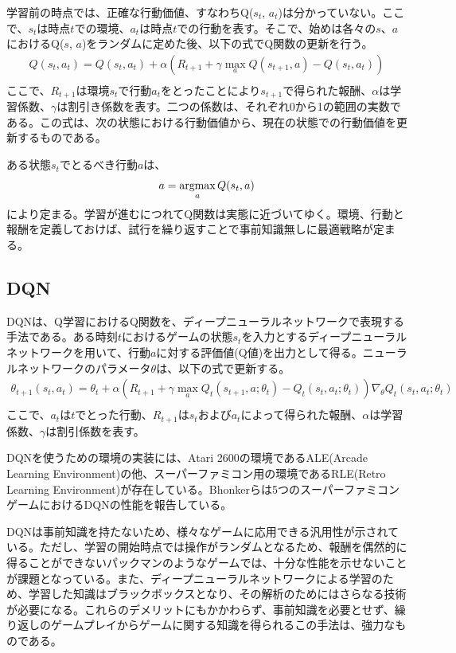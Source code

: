 \documentclass[12pt]{jreport}
\newcommand{\argmax}{\mathop{\rm argmax}\limits}
\begin{document}
学習前の時点では、正確な行動価値、すなわちQ($s_t$, $a_t$)は分かっていない。ここで、$s_t$は時点$t$での環境、$a_t$は時点$t$での行動を表す。そこで、始めは各々の$s$、$a$におけるQ($s$, $a$)をランダムに定めた後、以下の式でQ関数の更新を行う。
\begin{eqnarray}
  Q(s_{t}, a_{t}) = Q(s_t, a_t) + \alpha (R_{t+1} + \gamma \max_a Q(s_{t+1}, a) - Q(s_t, a_t)) \nonumber\\
\end{eqnarray}
ここで、$R_{t+1}$は環境$s_t$で行動$a_t$をとったことにより$s_{t+1}$で得られた報酬、$\alpha$は学習係数、$\gamma$は割引き係数を表す。二つの係数は、それぞれ0から1の範囲の実数である。この式は、次の状態における行動価値から、現在の状態での行動価値を更新するものである。

ある状態$s_t$でとるべき行動$a$は、
\[
a = \argmax_a Q(s_t, a)
\]
により定まる。学習が進むにつれてQ関数は実態に近づいてゆく。環境、行動と報酬を定義しておけば、試行を繰り返すことで事前知識無しに最適戦略が定まる。

\subsection{DQN}
DQNは、Q学習におけるQ関数を、ディープニューラルネットワークで表現する手法である。ある時刻$t$におけるゲームの状態$s_t$を入力とするディープニューラルネットワークを用いて、行動$a$に対する評価値(Q値)を出力として得る。ニューラルネットワークのパラメータ$\theta$は、以下の式で更新する。
\begin{eqnarray}
\theta_{t+1}(s_t, a_t) = \theta_t + \alpha (R_{t+1} + \gamma \max_a Q_t(s_{t+1}, a; \theta_t) - Q_t(s_t, a_t; \theta_t))\nabla_\theta Q_t(s_t, a_t; \theta_t) \nonumber\\
\end{eqnarray}
ここで、$a_t$は$t$でとった行動、$R_{t+1}$は$s_t$および$a_t$によって得られた報酬、$\alpha$は学習係数、$\gamma$は割引係数を表す。

DQNを使うための環境の実装には、Atari 2600の環境であるALE(Arcade Learning Environment)\cite{ALE}の他、スーパーファミコン用の環境であるRLE(Retro Learning Environment)\cite{RLE}が存在している。Bhonkerらは5つのスーパーファミコンゲームにおけるDQNの性能を報告している\cite{RLE}。

DQNは事前知識を持たないため、様々なゲームに応用できる汎用性が示されている。ただし、学習の開始時点では操作がランダムとなるため、報酬を偶然的に得ることができないパックマンのようなゲームでは、十分な性能を示せないことが課題となっている。また、ディープニューラルネットワークによる学習のため、学習した知識はブラックボックスとなり、その解析のためにはさらなる技術が必要になる。これらのデメリットにもかかわらず、事前知識を必要とせず、繰り返しのゲームプレイからゲームに関する知識を得られるこの手法は、強力なものである。
\end{document}
